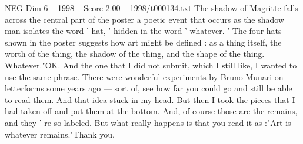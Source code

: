 \begin{textsample}{NEG Dim 6 – 1998 – Score 2.00 – 1998/t000134.txt}
The shadow of Magritte falls across the central part of the poster a poetic event that occurs as the shadow man isolates the word ' hat, ' hidden in the word ' whatever. ' The four hats shown in the poster suggests how art might be defined : as a thing itself, the worth of the thing, the shadow of the thing, and the shape of the thing.
Whatever."OK.
And the one that I did not submit, which I still like, I wanted to use the same phrase.
There were wonderful experiments by Bruno Munari on letterforms some years ago — sort of, see how far you could go and still be able to read them.
And that idea stuck in my head.
But then I took the pieces that I had taken off and put them at the bottom.
And, of course those are the remains, and they ' re so labeled.
But what really happens is that you read it as :"Art is whatever remains."Thank you.

\end{textsample}
